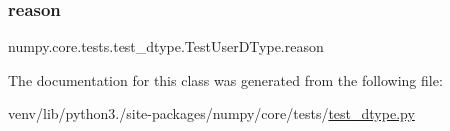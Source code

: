 \subsubsection{\texorpdfstring{reason}{reason}}
{\footnotesize\ttfamily numpy.\+core.\+tests.\+test\+\_\+dtype.\+Test\+User\+D\+Type.\+reason\hspace{0.3cm}{\ttfamily [static]}}



The documentation for this class was generated from the following file\+:\begin{DoxyCompactItemize}
\item 
venv/lib/python3./site-\/packages/numpy/core/tests/\hyperlink{test__dtype_8py}{test\+\_\+dtype.\+py}\end{DoxyCompactItemize}
